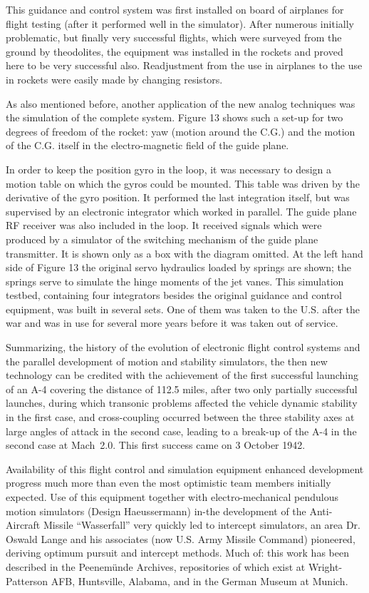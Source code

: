 \documentclass[11pt, a4paper]{article}
\begin{document}
This guidance and control system was first installed on board of airplanes for flight testing (after it performed well in the simulator). After numerous initially problematic, but finally very successful flights, which were surveyed from the ground by theodolites, the equipment was installed in the rockets and proved here to be very successful also. Readjustment from the use in airplanes to the use in rockets were easily made by changing resistors.

As also mentioned before, another application of the new analog techniques was the simulation of the complete system. Figure 13 shows such a set-up for two degrees of freedom of the rocket: yaw (motion around the C.G.) and the motion of the C.G. itself in the electro-magnetic field of the guide plane.

In order to keep the position gyro in the loop, it was necessary to design a motion table on which the gyros could be mounted. This table was driven by the derivative of the gyro position. It performed the last integration itself, but was supervised by an electronic integrator which worked in parallel. The guide plane RF receiver was also included in the loop. It received signals which were produced by a simulator of the switching mechanism of the guide plane transmitter. It is shown only as a box with the diagram omitted. At the left hand side of Figure 13 the original servo hydraulics loaded by springs are shown; the springs serve to simulate the hinge moments of the jet vanes. This simulation testbed, containing four integrators besides the original guidance and control equipment, was built in several sets. One of them was taken to the U.S. after the war and was in use for several more years before it was taken out of service.

Summarizing, the history of the evolution of electronic flight control systems and the parallel development of motion and stability simulators, the then new technology can be credited with the achievement of the first successful launching of an A-4 covering the distance of 112.5 miles, after two only partially successful launches, during which transonic problems affected the vehicle dynamic stability in the first case, and cross-coupling occurred between the three stability axes at large angles of attack in the second case, leading to a break-up of the A-4 in the second case at Mach~2.0. This first success came on 3 October 1942.

Availability of this flight control and simulation equipment enhanced development progress much more than even the most optimistic team members initially expected. Use of this equipment together with electro-mechanical pendulous motion simulators (Design Haeussermann) in-the development of the Anti-Aircraft Missile ``Wasserfall'' very quickly led to intercept simulators, an area Dr. Oswald Lange and his associates (now U.S. Army Missile Command) pioneered, deriving optimum pursuit and intercept methods. Much of: this work has been described in the Peenemünde  Archives, repositories of which exist at Wright-Patterson AFB, Huntsville, Alabama, and in the German Museum at Munich.
\end{document}
